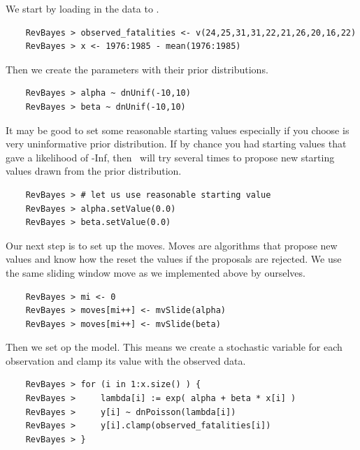 \documentclass[11pt]{article}
\begin{document}
We start by loading in the data to \RevBayes.
{\tt \begin{snugshade*}
\begin{lstlisting} 
    RevBayes > observed_fatalities <- v(24,25,31,31,22,21,26,20,16,22)
    RevBayes > x <- 1976:1985 - mean(1976:1985)
\end{lstlisting}
\end{snugshade*}}
Then we create the parameters with their prior distributions.
{\tt \begin{snugshade*}
\begin{lstlisting} 
    RevBayes > alpha ~ dnUnif(-10,10) 
    RevBayes > beta ~ dnUnif(-10,10)
\end{lstlisting}
\end{snugshade*}}
It may be good to set some reasonable starting values especially if you choose is very uninformative prior distribution.
If by chance you had starting values that gave a likelihood of -Inf, then \RevBayes~will try several times to propose new starting values drawn from the prior distribution.
{\tt \begin{snugshade*}
\begin{lstlisting} 
    RevBayes > # let us use reasonable starting value
    RevBayes > alpha.setValue(0.0)
    RevBayes > beta.setValue(0.0)
\end{lstlisting}
\end{snugshade*}}
Our next step is to set up the moves.
Moves are algorithms that propose new values and know how the reset the values if the proposals are rejected.
We use the same sliding window move as we implemented above by ourselves.
{\tt \begin{snugshade*}
\begin{lstlisting} 
    RevBayes > mi <- 0
    RevBayes > moves[mi++] <- mvSlide(alpha)
    RevBayes > moves[mi++] <- mvSlide(beta)
\end{lstlisting}
\end{snugshade*}}
Then we set op the model.
This means we create a stochastic variable for each observation and clamp its value with the observed data.
{\tt \begin{snugshade*}
\begin{lstlisting} 
    RevBayes > for (i in 1:x.size() ) {
    RevBayes >     lambda[i] := exp( alpha + beta * x[i] )
    RevBayes >     y[i] ~ dnPoisson(lambda[i])
    RevBayes >     y[i].clamp(observed_fatalities[i])
    RevBayes > }
\end{lstlisting}
\end{snugshade*}}
\end{document}
